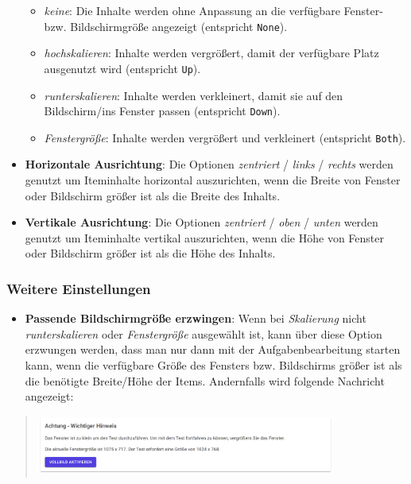 \documentclass[
  letterpaper,
  DIV=11]{scrreprt}
\providecommand{\tightlist}{%
  \setlength{\itemsep}{0pt}\setlength{\parskip}{0pt}}\usepackage{longtable,booktabs,array}
\begin{document}
\begin{tcolorbox}
\begin{itemize}
  \begin{itemize}
  \tightlist
  \item
    \emph{keine}: Die Inhalte werden ohne Anpassung an die verfügbare
    Fenster- bzw. Bildschirmgröße angezeigt (entspricht \texttt{None}).
  \item
    \emph{hochskalieren}: Inhalte werden vergrößert, damit der
    verfügbare Platz ausgenutzt wird (entspricht \texttt{Up}).
  \item
    \emph{runterskalieren}: Inhalte werden verkleinert, damit sie auf
    den Bildschirm/ins Fenster passen (entspricht \texttt{Down}).
  \item
    \emph{Fenstergröße}: Inhalte werden vergrößert und verkleinert
    (entspricht \texttt{Both}).
  \end{itemize}
\item
  \textbf{Horizontale Ausrichtung}: Die Optionen \emph{zentriert} /
  \emph{links} / \emph{rechts} werden genutzt um Iteminhalte horizontal
  auszurichten, wenn die Breite von Fenster oder Bildschirm größer ist
  als die Breite des Inhalts.
\item
  \textbf{Vertikale Ausrichtung}: Die Optionen \emph{zentriert} /
  \emph{oben} / \emph{unten} werden genutzt um Iteminhalte vertikal
  auszurichten, wenn die Höhe von Fenster oder Bildschirm größer ist als
  die Höhe des Inhalts.
\end{itemize}

\hypertarget{weitere-einstellungen-1}{%
\subsubsection{Weitere Einstellungen}\label{weitere-einstellungen-1}}

\begin{itemize}
\tightlist
\item
  \textbf{Passende Bildschirmgröße erzwingen}: Wenn bei
  \emph{Skalierung} nicht \emph{runterskalieren} oder
  \emph{Fenstergröße} ausgewählt ist, kann über diese Option erzwungen
  werden, dass man nur dann mit der Aufgabenbearbeitung starten kann,
  wenn die verfügbare Größe des Fensters bzw. Bildschirms größer ist als
  die benötigte Breite/Höhe der Items. Andernfalls wird folgende
  Nachricht angezeigt:
\end{itemize}

\begin{quote}
\includegraphics[width=0.8\textwidth,height=\textheight]{img/screenshot-irtlib-player-message-resolution-too-low-DEU.png}
\end{quote}


\end{tcolorbox}
\end{document}
